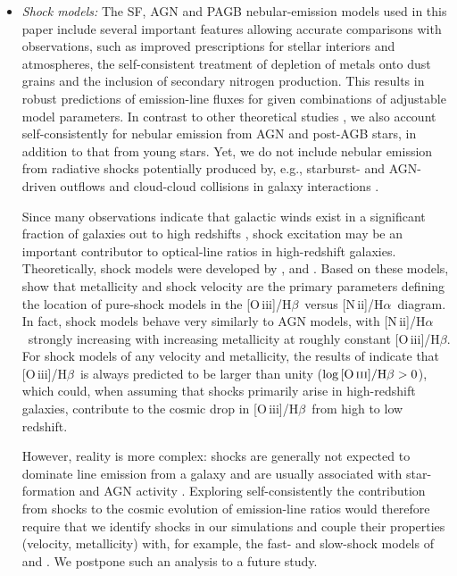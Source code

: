 \documentclass[fleqn,usenatbib]{mnras}
\newcommand{\oiiihb}{\hbox{[O\,{\sc iii}]/H$\beta$}}
\newcommand{\niiha}{\hbox{[N\,{\sc ii}]/H$\alpha$}}
\begin{document}
\begin{itemize}
\item{\em Shock models:}
The SF, AGN and PAGB nebular-emission models used in this paper 
include several important features allowing accurate comparisons with 
observations, such as improved prescriptions for stellar interiors and
atmospheres, the self-consistent treatment of depletion of metals onto 
dust grains and the inclusion of secondary nitrogen production. This
results in robust predictions of emission-line fluxes for given
combinations of adjustable model parameters. In contrast to other
theoretical studies  \citep{Orsi14,Shimizu16}, we also account
self-consistently for nebular emission from AGN and post-AGB stars, in
addition to that from young stars. Yet, we do not include nebular
emission from radiative shocks potentially produced by, e.g.,
starburst- and AGN-driven outflows and cloud-cloud  collisions in
galaxy interactions \citep[e.g.,][]{Sharp10, Rich10, Rich11,Soto12,
  Weistrop12}.  
  
Since many observations indicate that galactic winds exist in a
significant fraction of galaxies out to high redshifts
\citep[e.g.,][]{Kornei12, Steidel10, Genzel11, Newman12}, shock
excitation may be an important contributor to optical-line ratios in
high-redshift galaxies. Theoretically, shock models were developed by
\citet{Dopita03}, \citet[fast shocks]{Allen08} and \citet[slow
shocks]{Rich10, Rich11}. Based on these models, \citet[their
fig.~6]{Kewley13} show that metallicity and shock velocity are the
primary parameters defining the location of pure-shock models  in the
\oiiihb\ versus \niiha\ diagram. In fact, shock models behave very
similarly to AGN models, with \niiha\ strongly increasing with
increasing metallicity at roughly constant \oiiihb. For shock models
of any velocity and metallicity, the results of \citet{Kewley13}
indicate that \oiiihb\ is  always predicted to be larger than unity
($\log\oiiihb>0$), which could,  when assuming that shocks primarily
arise in high-redshift galaxies,  contribute to the cosmic drop in
\oiiihb\ from high to low redshift.  

However, reality is more complex: shocks are generally not
  expected to dominate line emission from a galaxy and are usually
  associated with star-formation and AGN activity \citep[see,
  e.g.,][]{Kewley13}. Exploring self-consistently the contribution
from  shocks to the cosmic evolution of emission-line ratios would
therefore require that we identify shocks in our simulations and
couple their  properties (velocity, metallicity) with, for example,
the fast- and slow-shock models of \citet{Allen08} and \citet{Rich10,
  Rich11}. We postpone such an analysis to a future study.


\end{itemize}
\end{document}
